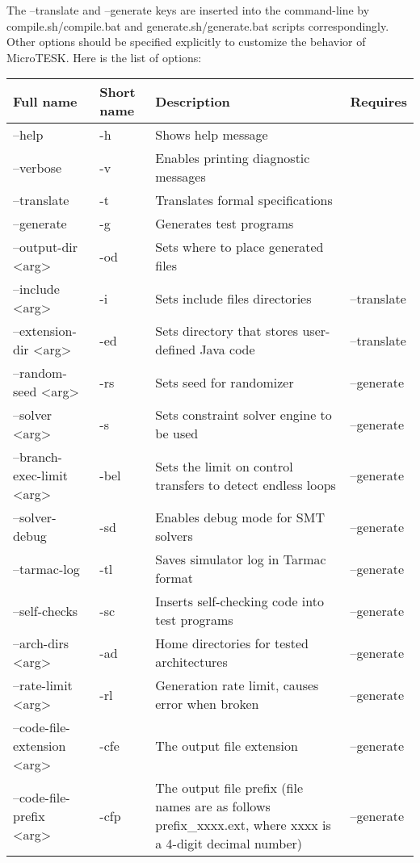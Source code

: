 \documentclass[oneside,final,14pt]{extreport}
\begin{document}
The --translate and --generate keys are inserted into the command-line by
compile.sh/compile.bat and generate.sh/generate.bat scripts correspondingly.
Other options should be specified explicitly to customize the behavior of MicroTESK.
Here is the list of options:

\begin{tabular}{ | p{4cm} | p{1cm} | p{5cm} | p{3cm} |}
  \hline
  Full name & Short name & Description & Requires \\ \hline
  --help & -h & Shows help message & \\ \hline
  --verbose & -v & Enables printing diagnostic messages & \\ \hline
  --translate & -t & Translates formal specifications & \\ \hline
  --generate & -g & Generates test programs & \\ \hline
  --output-dir <arg> & -od & Sets where to place generated files & \\ \hline
  --include <arg> & -i & Sets include files directories & --translate \\ \hline
  --extension-dir <arg> & -ed & Sets directory that stores user-defined Java code & --translate \\ \hline
  --random-seed <arg> & -rs & Sets seed for randomizer & --generate \\ \hline
  --solver <arg> & -s & Sets constraint solver engine to be used & --generate \\ \hline
  --branch-exec-limit <arg> & -bel & Sets the limit on control transfers to detect endless loops & --generate \\ \hline
  --solver-debug & -sd & Enables debug mode for SMT solvers & --generate \\ \hline
  --tarmac-log  & -tl & Saves simulator log in Tarmac format & --generate \\ \hline
  --self-checks & -sc & Inserts self-checking code into test programs & --generate \\ \hline
  --arch-dirs <arg> & -ad & Home directories for tested architectures & --generate \\ \hline
  --rate-limit <arg> & -rl & Generation rate limit, causes error when broken & --generate \\ \hline
  --code-file-extension <arg> & -cfe & The output file extension & --generate \\ \hline
  --code-file-prefix <arg> & -cfp & The output file prefix (file names are as follows prefix{\_}xxxx.ext, where xxxx is a 4-digit decimal number) & --generate \\ \hline

\end{tabular}
\end{document}
